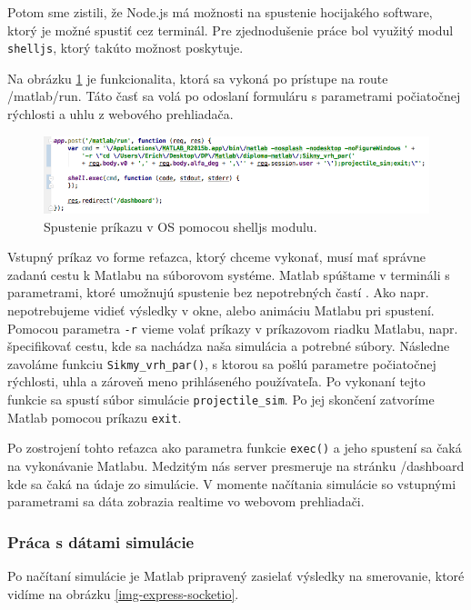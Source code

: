 Potom sme zistili, že Node.js má možnosti na spustenie hocijakého software, ktorý je možné spustiť cez terminál. Pre zjednodušenie práce bol využitý modul \verb|shelljs|, ktorý takúto možnost poskytuje.

Na obrázku \ref{img-express-shelljs} je funkcionalita, ktorá sa vykoná po prístupe na route /matlab/run. Táto časť sa volá po odoslaní formuláru s parametrami počiatočnej rýchlosti a uhlu z webového prehliadača.

\begin{figure}[H]
  \centering
  \includegraphics[scale=0.6]{img/code/express-shelljs.png}
  \caption{Spustenie príkazu v OS pomocou shelljs modulu.}
  \label{img-express-shelljs}
\end{figure}

Vstupný príkaz vo forme reťazca, ktorý chceme vykonať, musí mať správne zadanú cestu k Matlabu na súborovom systéme. Matlab spúštame v termináli s parametrami, ktoré umožnujú spustenie bez nepotrebných častí \cite{matlab-macos}. Ako napr. nepotrebujeme vidieť výsledky v okne, alebo animáciu Matlabu pri spustení. Pomocou parametra \verb|-r| vieme volať príkazy v príkazovom riadku Matlabu, napr. špecifikovať cestu, kde sa nachádza naša simulácia a potrebné súbory. Následne zavoláme funkciu \verb|Sikmy_vrh_par()|, s ktorou sa pošlú parametre počiatočnej rýchlosti, uhla a zároveň meno prihláseného používateľa. Po vykonaní tejto funkcie sa spustí súbor simulácie \verb|projectile_sim|. Po jej skončení zatvoríme Matlab pomocou príkazu \verb|exit|.

Po zostrojení tohto reťazca ako parametra funkcie \verb|exec()| a jeho spustení sa čaká na vykonávanie Matlabu. Medzitým nás server presmeruje na stránku /dashboard kde sa čaká na údaje zo simulácie. V momente načítania simulácie so vstupnými parametrami sa dáta zobrazia realtime vo webovom prehliadači.

\subsubsection{Práca s dátami simulácie}
Po načítaní simulácie je Matlab pripravený zasielať výsledky na smerovanie, ktoré vidíme na obrázku \ref{img-express-socketio}. 

